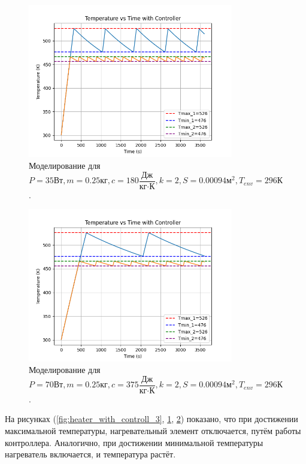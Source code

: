 \begin{figure}[h]  %
	\centering
	\includegraphics[width=0.8\textwidth]{imgs/heater_w._controll_2.png}  %
	\caption{Моделирование для 
		\[
		P=35\text{Вт}, m = 0.25\text{кг}, c=180\frac{\text{Дж}}{\text{кг}\cdot\text{К}},k = 2, S = 0.00094 \text{м}^2,T_{env}= 296 \text{К}
		\].}  %
	\label{fig:heater_with_controll_2}  
\end{figure}
\begin{figure}[h]  %
	\centering
	\includegraphics[width=0.8\textwidth]{imgs/heater_w._controll_3.png}  %
	\caption{Моделирование для 
		\[
		P=70\text{Вт}, m = 0.25\text{кг}, c=375\frac{\text{Дж}}{\text{кг}\cdot\text{К}},k = 2, S = 0.00094 \text{м}^2,T_{env}= 296 \text{К}
		\].}  %
	\label{fig:heater_with_controll_1}  
\end{figure}
\newpage
На рисунках (\ref{fig:heater_with_controll_3}, \ref{fig:heater_with_controll_2}, \ref{fig:heater_with_controll_1}) показано, что при достижении максимальной температуры, нагревательный элемент отключается, путём работы контроллера. Аналогично, при достижении минимальной температуры нагреватель включается, и температура растёт.